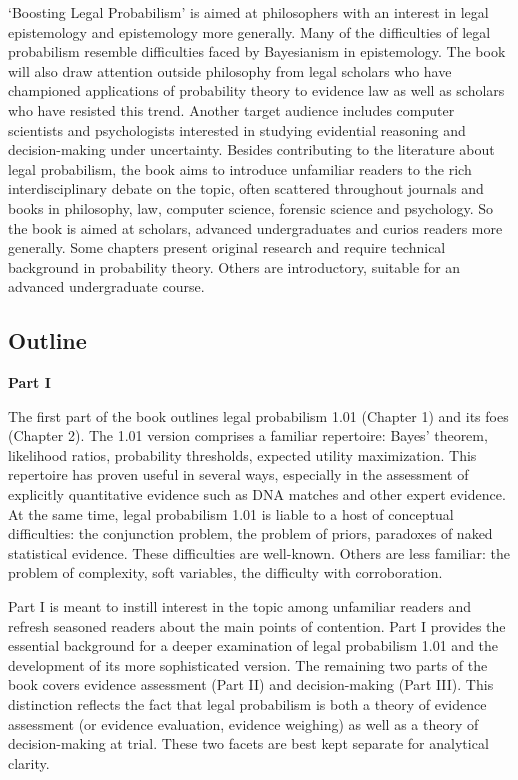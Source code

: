 \documentclass[10pt,dvipsnames,enabledeprecatedfontcommands]{scrartcl}
\begin{document}
`Boosting Legal Probabilism' is aimed at philosophers with an interest
in legal epistemology and epistemology more generally. Many of the
difficulties of legal probabilism resemble difficulties faced by
Bayesianism in epistemology. The book will also draw attention outside
philosophy from legal scholars who have championed applications of
probability theory to evidence law as well as scholars who have resisted
this trend. Another target audience includes computer scientists and
psychologists interested in studying evidential reasoning and
decision-making under uncertainty. Besides contributing to the
literature about legal probabilism, the book aims to introduce
unfamiliar readers to the rich interdisciplinary debate on the topic,
often scattered throughout journals and books in philosophy, law,
computer science, forensic science and psychology. So the book is aimed
at scholars, advanced undergraduates and curios readers more generally.
Some chapters present original research and require technical background
in probability theory. Others are introductory, suitable for an advanced
undergraduate course.

\hypertarget{outline}{%
\subsection{Outline}\label{outline}}

\noindent \textbf{Part I}

\noindent The first part of the book outlines legal probabilism 1.01
(Chapter 1) and its foes (Chapter 2). The 1.01 version comprises a
familiar repertoire: Bayes' theorem, likelihood ratios, probability
thresholds, expected utility maximization. This repertoire has proven
useful in several ways, especially in the assessment of explicitly
quantitative evidence such as DNA matches and other expert evidence. At
the same time, legal probabilism 1.01 is liable to a host of conceptual
difficulties: the conjunction problem, the problem of priors, paradoxes
of naked statistical evidence. These difficulties are well-known. Others
are less familiar: the problem of complexity, soft variables, the
difficulty with corroboration.

Part I is meant to instill interest in the topic among unfamiliar
readers and refresh seasoned readers about the main points of
contention. Part I provides the essential background for a deeper
examination of legal probabilism 1.01 and the development of its more
sophisticated version. The remaining two parts of the book covers
evidence assessment (Part II) and decision-making (Part III). This
distinction reflects the fact that legal probabilism is both a theory of
evidence assessment (or evidence evaluation, evidence weighing) as well
as a theory of decision-making at trial. These two facets are best kept
separate for analytical clarity.
\end{document}
